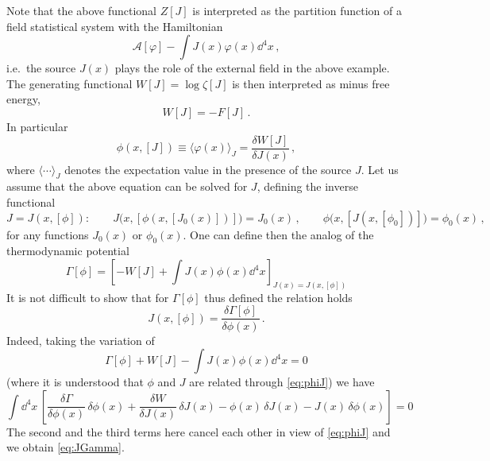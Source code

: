 Note that the above functional $Z[J]$ is interpreted as the partition function
of a field statistical system with the Hamiltonian
\[
\mathcal A[\varphi]-\int J(x)\varphi(x)\dd^4x\,,
\]
i.e.\ the source $J(x)$ plays the role of the external field in the above
example. The generating functional $W[J]=\log\zeta[J]$ is then interpreted as
minus free energy,
\[
W[J]=-F[J]\,.
\]
In particular
\begin{equation}\label{eq:phiJ}
\phi(x,[J])\equiv\bigl\langle\varphi(x)\bigr\rangle_J=\frac{\delta W[J]}{\delta J(x)}\,,
\end{equation}
where $\langle\cdots\rangle_J$ denotes the expectation value in the presence
of the source $J$. Let us assume that the above equation can be solved for $J$,
defining the inverse functional
\[
J=J(x,[\phi]):\qquad J\bigl(x,[\phi(x,[J_0(x)])]\bigr)=J_0(x)\,,\qquad
\phi\bigl(x,[J(x,[\phi_0])]\bigr)=\phi_0(x)\,,
\]
for any functions $J_0(x)$ or $\phi_0(x)$. One can define then the analog of
the thermodynamic potential
\[
\Gamma[\phi]=\left[-W[J]+\int J(x)\phi(x)\dd^4x\right]_{J(x)=J(x,[\phi])}
\]
It is not difficult to show that for $\Gamma[\phi]$ thus defined the relation
holds
\begin{equation}\label{eq:JGamma}
J(x,[\phi])=\frac{\delta\Gamma[\phi]}{\delta\phi(x)}\,.
\end{equation}
Indeed, taking the variation of
\[
\Gamma[\phi]+W[J]-\int J(x)\phi(x)\dd^4x=0
\]
(where it is understood that $\phi$ and $J$ are related through
\eqref{eq:phiJ}) we have
\[
\int \dd^4x\,\left[\frac{\delta\Gamma}{\delta\phi(x)}\,\delta\phi(x)+\frac{\delta W}{\delta J(x)}\,\delta J(x)-\phi(x)\,\delta J(x)-J(x)\,\delta\phi(x)\right]=0
\]
The second and the third terms here cancel each other in view of
\eqref{eq:phiJ} and we obtain \eqref{eq:JGamma}.

